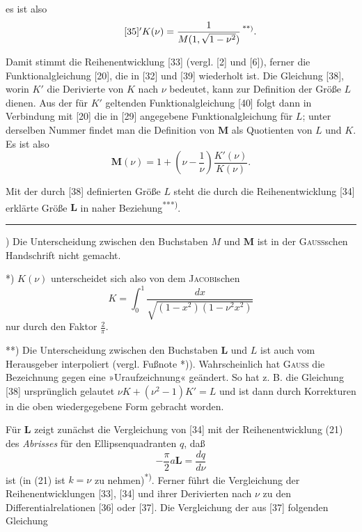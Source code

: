 \noindent es ist also
\begin{equation*}\tag*{$[35]'$}K(\nu)=\frac1{M(1,\sqrt{1-\nu^2})}\,\text{\textsuperscript{**)}}.\end{equation*}
\par\indent Damit stimmt die Reihenentwicklung [33] (vergl. [2] und [6]), ferner die Funktionalgleichung [20], die in [32] und [39] wiederholt ist. Die Gleichung [38], worin $K'$ die Derivierte von $K$ nach $\nu$ bedeutet, kann zur Definition der Größe $L$ dienen. Aus der für $K'$ geltenden Funktionalgleichung [40] folgt dann in Verbindung mit [20] die in [29] angegebene Funktionalgleichung für $L$; unter derselben Nummer findet man die Definition von $\mathbf M$ als Quotienten von $L$ und $K$. Es ist also
\begin{equation*}\tag*{$[29]'$}\mathbf M(\nu)=1+\left(\nu-\frac1\nu\right)\frac{K'(\nu)}{K(\nu)}.\end{equation*}
\par\indent Mit der durch [38] definierten Größe $L$ steht die durch die Reihenentwicklung [34] erklärte Größe $\mathbf L$ in naher Beziehung\textsuperscript{***)}.
\par\smallskip\noindent\rule{.25\linewidth}{.4pt}\par
{\small
\par\indent *) Die Unterscheidung zwischen den Buchstaben $M$ und $\mathbf M$ ist in der \textsc{Gauss}schen Handschrift nicht gemacht.
\par\indent **) $K(\nu)$ unterscheidet sich also von dem \textsc{Jacobi}schen
\[K=\int_0^1\frac{dx}{\sqrt{(1-x^2)(1-\nu^2x^2)}}\]
\noindent nur durch den Faktor $\frac2\pi$.
\par\indent ***) Die Unterscheidung zwischen den Buchstaben $\mathbf L$ und $L$ ist auch vom Herausgeber interpoliert (vergl. Fußnote *)). Wahrscheinlich hat \textsc{Gauss} die Bezeichnung gegen eine »Uraufzeichnung« geändert. So hat z. B. die Gleichung [38] ursprünglich gelautet $\nu K+(\nu^2-1)K'=L$ und ist dann durch Korrekturen in die oben wiedergegebene Form gebracht worden.
\par}
\clearpage
{}
\par\indent Für $\mathbf L$ zeigt zunächst die Vergleichung von [34] mit der Reihenentwicklung (21) des \textit{Abrisses} für den Ellipsenquadranten $q$, daß
\begin{equation*}\tag*{$[34]'$}-\frac\pi2a\mathbf L=\frac{dq}{d\nu}\end{equation*}
\noindent ist (in (21) ist $k=\nu$ zu nehmen)\textsuperscript{*)}. Ferner führt die Vergleichung der Reihenentwicklungen [33], [34] und ihrer Derivierten nach $\nu$ zu den Differentialrelationen [36] oder [37]. Die Vergleichung der aus [37] folgenden Gleichung
